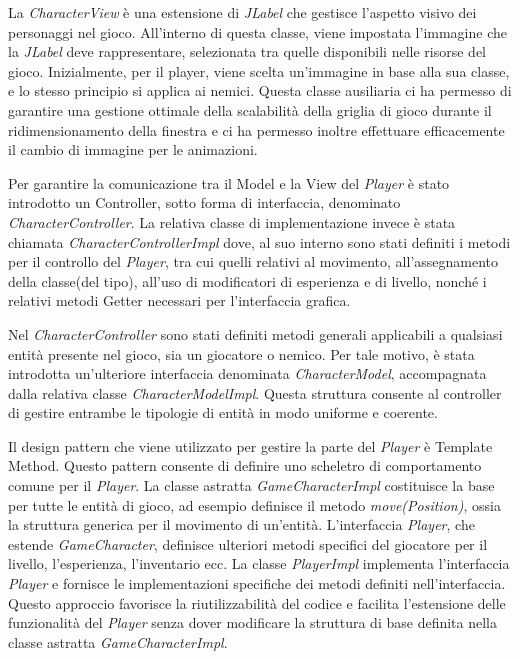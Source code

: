 \documentclass[a4paper,12pt]{report}
\begin{document}
La \textit{CharacterView} è una estensione di \textit{JLabel} che gestisce l'aspetto visivo dei personaggi nel gioco. All'interno di questa classe, viene impostata l'immagine che la \textit{JLabel} deve rappresentare, selezionata tra quelle disponibili nelle risorse del gioco. Inizialmente, per il player, viene scelta un'immagine in base alla sua classe, e lo stesso principio si applica ai nemici. Questa classe ausiliaria ci ha permesso di garantire una gestione ottimale della scalabilità della griglia di gioco durante il ridimensionamento della finestra e ci ha permesso inoltre effettuare efficacemente il cambio di immagine per le animazioni.

Per garantire la comunicazione tra il Model e la View del \textit{Player} è stato introdotto un Controller, sotto forma di interfaccia, denominato \textit{CharacterController}. La relativa classe di implementazione invece è stata chiamata \textit{CharacterControllerImpl} dove, al suo interno sono stati definiti i metodi per il controllo del \textit{Player}, tra cui quelli relativi al movimento, all'assegnamento della classe(del tipo), all'uso di modificatori di esperienza e di livello, nonché i relativi metodi Getter necessari per l'interfaccia grafica.

Nel \textit{CharacterController} sono stati definiti metodi generali applicabili a qualsiasi entità presente nel gioco, sia un giocatore o nemico. Per tale motivo, è stata introdotta un'ulteriore interfaccia denominata \textit{CharacterModel}, accompagnata dalla relativa classe \textit{CharacterModelImpl}. Questa struttura consente al controller di gestire entrambe le tipologie di entità in modo uniforme e coerente.

Il design pattern che viene utilizzato per gestire la parte del \textit{Player} è Template Method. Questo pattern consente di definire uno scheletro di comportamento comune per il \textit{Player}. La classe astratta \textit{GameCharacterImpl} costituisce la base per tutte le entità di gioco, ad esempio definisce il metodo \textit{move(Position)}, ossia la struttura generica per il movimento di un'entità. L'interfaccia \textit{Player}, che estende \textit{GameCharacter}, definisce ulteriori metodi specifici del giocatore per il livello, l'esperienza, l'inventario ecc. La classe \textit{PlayerImpl} implementa l'interfaccia \textit{Player} e fornisce le implementazioni specifiche dei metodi definiti nell'interfaccia. Questo approccio favorisce la riutilizzabilità del codice e facilita l'estensione delle funzionalità del \textit{Player} senza dover modificare la struttura di base definita nella classe astratta \textit{GameCharacterImpl}.
\end{document}
